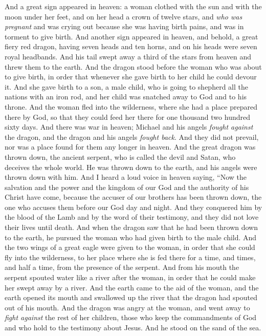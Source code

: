 \begin{biblechapter} %
 And a great sign appeared in heaven: a woman clothed with the sun and with the moon under her feet, and on her head a crown of twelve stars,
\verse and \textit{who was pregnant} and was crying out because she was having birth pains, and was in torment to give birth.
\verse And another sign appeared in heaven, and behold, a great fiery red dragon, having seven heads and ten horns, and on his heads were seven royal headbands.
\verse And his tail swept away a third of the stars from heaven and threw them to the earth. And the dragon stood before the woman who was about to give birth, in order that whenever she gave birth to her child he could devour it.
\verse And she gave birth to a son, a male child, who is going to shepherd all the nations with an iron rod, and her child was snatched away to God and to his throne.
\verse And the woman fled into the wilderness, where she had a place prepared there by God, so that they could feed her there for one thousand two hundred sixty days.
 And there was war in heaven; Michael and his angels \textit{fought against} the dragon, and the dragon and his angels \textit{fought back}.
\verse And they did not prevail, nor was a place found for them any longer in heaven.
\verse And the great dragon was thrown down, the ancient serpent, who is called the devil and Satan, who deceives the whole world. He was thrown down to the earth, and his angels were thrown down with him.
\verse And I heard a loud voice in heaven saying,
\verse “Now the salvation and the power 
and the kingdom of our God 
and the authority of his Christ have come, 
because the accuser of our brothers has been thrown down, 
the one who accuses them before our God day and night.
\verse And they conquered him by the blood of the Lamb 
and by the word of their testimony, 
and they did not love their lives until death.
\verse And when the dragon saw that he had been thrown down to the earth, he pursued the woman who had given birth to the male child.
\verse And the two wings of a great eagle were given to the woman, in order that she could fly into the wilderness, to her place where she is fed there for a time, and times, and half a time, from the presence of the serpent.
\verse And from his mouth the serpent spouted water like a river after the woman, in order that he could make her swept away by a river.
\verse And the earth came to the aid of the woman, and the earth opened its mouth and swallowed up the river that the dragon had spouted out of his mouth.
\verse And the dragon was angry at the woman, and went away to \textit{fight against} the rest of her children, those who keep the commandments of God and who hold to the testimony about Jesus.
\verse And he stood on the sand of the sea.
\end{biblechapter}

